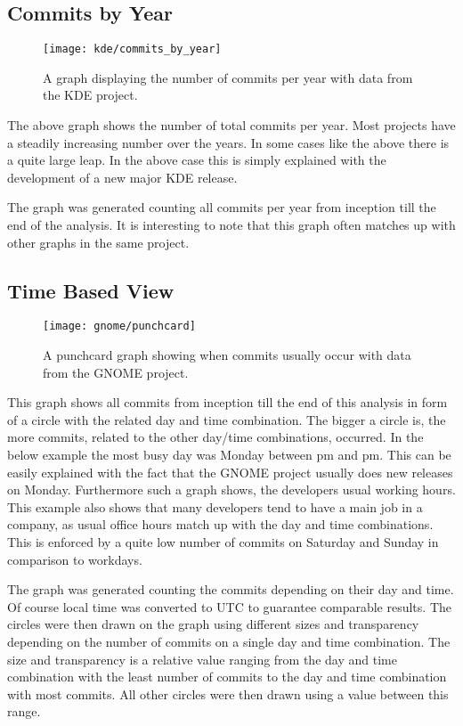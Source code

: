 
\subsection{Commits by Year} %

\begin{figure}[h!t]
  \centering
  \texttt{[image: kde/commits\_by\_year]}
  \caption{A graph displaying the number of commits per year with data from the
  KDE project.}
\end{figure}

The above graph shows the number of total commits per year. Most projects have
a steadily increasing number over the years. In some cases like the above there
is a quite large leap. In the above case this is simply explained with the
development of a new major KDE release.

The graph was generated counting all commits per year from inception till the
end of the analysis. It is interesting to note that this graph often matches up
with other graphs in the same project.


\subsection{Time Based View} %

\begin{figure}[h!t]
  \centering
  \texttt{[image: gnome/punchcard]}
  \caption{A punchcard graph showing when commits usually occur with data from
  the GNOME project.}
\end{figure}

This graph shows all commits from inception till the end of this analysis in
form of a circle with the related day and time combination. The bigger a circle
is, the more commits, related to the other day/time combinations, occurred. In
the below example the most busy day was Monday between \unit[4]{pm} and
\unit[12]{pm}. This can be easily explained with the fact that the GNOME
project usually does new releases on Monday. Furthermore such a graph shows,
the developers usual working hours. This example also shows that many
developers tend to have a main job in a company, as usual office hours match up
with the day and time combinations. This is enforced by a quite low number of
commits on Saturday and Sunday in comparison to workdays.

The graph was generated counting the commits depending on their day and time.
Of course local time was converted to \ac{UTC} to guarantee comparable results.
The circles were then drawn on the graph using different sizes and transparency
depending on the number of commits on a single day and time combination. The
size and transparency is a relative value ranging from the day and time
combination with the least number of commits to the day and time combination
with most commits. All other circles were then drawn using a value between this
range.

